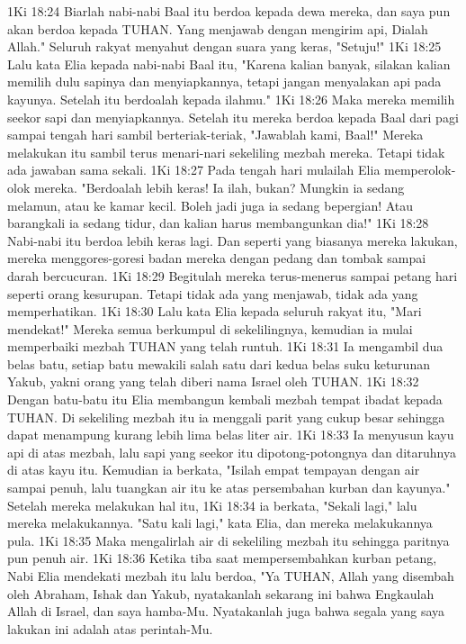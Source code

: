 1Ki 18:24  Biarlah nabi-nabi Baal itu berdoa kepada dewa mereka, dan saya pun akan berdoa kepada TUHAN. Yang menjawab dengan mengirim api, Dialah Allah." Seluruh rakyat menyahut dengan suara yang keras, "Setuju!"
1Ki 18:25  Lalu kata Elia kepada nabi-nabi Baal itu, "Karena kalian banyak, silakan kalian memilih dulu sapinya dan menyiapkannya, tetapi jangan menyalakan api pada kayunya. Setelah itu berdoalah kepada ilahmu."
1Ki 18:26  Maka mereka memilih seekor sapi dan menyiapkannya. Setelah itu mereka berdoa kepada Baal dari pagi sampai tengah hari sambil berteriak-teriak, "Jawablah kami, Baal!" Mereka melakukan itu sambil terus menari-nari sekeliling mezbah mereka. Tetapi tidak ada jawaban sama sekali.
1Ki 18:27  Pada tengah hari mulailah Elia memperolok-olok mereka. "Berdoalah lebih keras! Ia ilah, bukan? Mungkin ia sedang melamun, atau ke kamar kecil. Boleh jadi juga ia sedang bepergian! Atau barangkali ia sedang tidur, dan kalian harus membangunkan dia!"
1Ki 18:28  Nabi-nabi itu berdoa lebih keras lagi. Dan seperti yang biasanya mereka lakukan, mereka menggores-goresi badan mereka dengan pedang dan tombak sampai darah bercucuran.
1Ki 18:29  Begitulah mereka terus-menerus sampai petang hari seperti orang kesurupan. Tetapi tidak ada yang menjawab, tidak ada yang memperhatikan.
1Ki 18:30  Lalu kata Elia kepada seluruh rakyat itu, "Mari mendekat!" Mereka semua berkumpul di sekelilingnya, kemudian ia mulai memperbaiki mezbah TUHAN yang telah runtuh.
1Ki 18:31  Ia mengambil dua belas batu, setiap batu mewakili salah satu dari kedua belas suku keturunan Yakub, yakni orang yang telah diberi nama Israel oleh TUHAN.
1Ki 18:32  Dengan batu-batu itu Elia membangun kembali mezbah tempat ibadat kepada TUHAN. Di sekeliling mezbah itu ia menggali parit yang cukup besar sehingga dapat menampung kurang lebih lima belas liter air.
1Ki 18:33  Ia menyusun kayu api di atas mezbah, lalu sapi yang seekor itu dipotong-potongnya dan ditaruhnya di atas kayu itu. Kemudian ia berkata, "Isilah empat tempayan dengan air sampai penuh, lalu tuangkan air itu ke atas persembahan kurban dan kayunya." Setelah mereka melakukan hal itu,
1Ki 18:34  ia berkata, "Sekali lagi," lalu mereka melakukannya. "Satu kali lagi," kata Elia, dan mereka melakukannya pula.
1Ki 18:35  Maka mengalirlah air di sekeliling mezbah itu sehingga paritnya pun penuh air.
1Ki 18:36  Ketika tiba saat mempersembahkan kurban petang, Nabi Elia mendekati mezbah itu lalu berdoa, "Ya TUHAN, Allah yang disembah oleh Abraham, Ishak dan Yakub, nyatakanlah sekarang ini bahwa Engkaulah Allah di Israel, dan saya hamba-Mu. Nyatakanlah juga bahwa segala yang saya lakukan ini adalah atas perintah-Mu.
